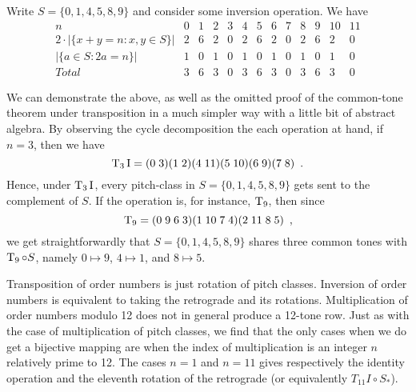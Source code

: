 \begin{example}
	\cite[11]{Rahn1975}
	Write $S = \{ 0, 1, 4, 5, 8, 9 \}$ and consider some inversion operation. We have
	\begin{equation}
		\begin{array}{ *{13}{c} }
			n & 0 & 1 & 2 & 3 & 4 & 5 & 6 & 7 & 8 & 9 & 10 & 11 \\
			2 \cdot |\{x + y = n : x, y \in S\}| &
			2 & 6 & 2 & 0 & 2 & 6 & 2 & 0 & 2 & 6 & 2 & 0 \\
			|\{a \in S : 2a = n\}| & 1 & 0 & 1 & 0 & 1 & 0 & 1 & 0 & 1 & 0 & 1 & 0 \\
			Total & 3 & 6 & 3 & 0 & 3 & 6 & 3 & 0 & 3 & 6 & 3 & 0
		\end{array}
	\end{equation}
\end{example}

We can demonstrate the above, as well as the omitted proof of the common-tone theorem under
transposition in a much simpler way with a little bit of abstract algebra. By observing
the cycle decomposition the each operation at hand, if $n = 3$, then we have
\begin{equation}
	\operatorname{T}_3\operatorname{I} = (0 \; 3) (1 \; 2) (4 \; 11) (5 \; 10) (6 \; 9) (7 \; 8) \enspace.
\end{equation}
Hence, under $\operatorname{T}_3\operatorname{I}$, every pitch-class in $S = \{ 0, 1, 4, 5, 8, 9 \}$ gets sent to the
complement of $S$. If the operation is, for instance, $\operatorname{T}_9$, then since
\begin{equation}
	\operatorname{T}_9 = (0 \; 9 \; 6 \; 3) (1 \; 10 \; 7 \; 4) (2 \; 11 \; 8 \; 5) \enspace,
\end{equation}
we get straightforwardly that $S = \{ 0, 1, 4, 5, 8, 9 \}$ shares three common tones with
$\operatorname{T}_9 \circ S$, namely $0 \mapsto 9$, $4 \mapsto 1$, and $8 \mapsto 5$.

Transposition of order numbers is just rotation of pitch classes. Inversion of order
numbers is equivalent to taking the retrograde and its rotations. Multiplication of
order numbers modulo 12 does not in general produce a 12-tone row. Just as with the case
of multiplication of pitch classes, we find that the only cases when we do get a
bijective mapping are when the index of multiplication is an integer $n$ relatively prime
to 12. The cases $n = 1$ and $n = 11$ gives respectively the identity operation and
the eleventh rotation of the retrograde (or equivalently $T_{11}I \circ S_*$).

